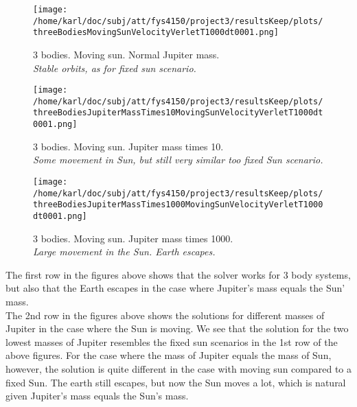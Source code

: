 \documentclass{article}
\begin{document}
\begin{minipage}{.3\textwidth} 
	\begin{figure}[H]
		\centering
		\texttt{[image: /home/karl/doc/subj/att/fys4150/project3/resultsKeep/plots/threeBodiesMovingSunVelocityVerletT1000dt0001.png]}
		\caption{3 bodies. Moving sun. Normal Jupiter mass. \\ \textit{Stable orbits, as for fixed sun scenario.}}
		\label{1}
	\end{figure}
\end{minipage}\hfill
\begin{minipage}{.3\textwidth} 
	\begin{figure}[H]
		\centering
		\texttt{[image: /home/karl/doc/subj/att/fys4150/project3/resultsKeep/plots/threeBodiesJupiterMassTimes10MovingSunVelocityVerletT1000dt0001.png]}
		\caption{3 bodies. Moving sun. Jupiter mass times 10. \\ \textit{Some movement in Sun, but still very similar too fixed Sun scenario.}}
		\label{1}
	\end{figure}
\end{minipage}\hfill
\begin{minipage}{.3\textwidth} 
	\begin{figure}[H]
		\centering
		\texttt{[image: /home/karl/doc/subj/att/fys4150/project3/resultsKeep/plots/threeBodiesJupiterMassTimes1000MovingSunVelocityVerletT1000dt0001.png]}
		\caption{3 bodies. Moving sun.  Jupiter mass times 1000. \\ \textit{Large movement in the Sun. Earth escapes.}}
		\label{1}
	\end{figure}
\end{minipage}\hfill
\vspace{2ex}

The first row in the figures above shows that the solver works for 3 body systems, but also that the Earth escapes in the case where Jupiter's mass equals the Sun' mass.\\

The 2nd row in the figures above shows the solutions for different masses of Jupiter in the case where the Sun is moving. We see that the solution for the two lowest masses of Jupiter resembles the fixed sun scenarios in the 1st row of the above figures. For the case where the mass of Jupiter equals the mass of Sun, however, the solution is quite different in the case with moving sun compared to a fixed Sun. The earth still escapes, but now the Sun moves a lot, which is natural given Jupiter's mass equals the Sun's mass. \\
\end{document}
